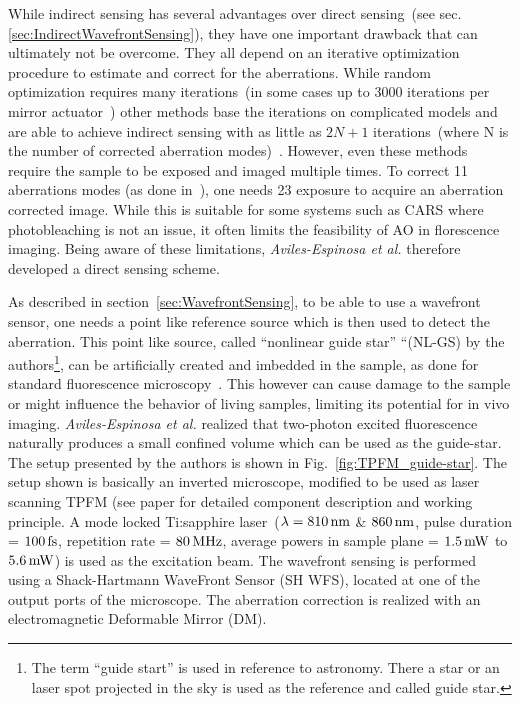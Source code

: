 While indirect sensing has several advantages over direct sensing~(see sec. \ref{sec:IndirectWavefrontSensing}), they have one important drawback that can ultimately not be overcome. They all depend on an iterative optimization procedure to estimate and correct for the aberrations. While random optimization requires many iterations~(in some cases up to 3000 iterations per mirror actuator~\cite{scan_CARS}) other methods base the iterations on complicated models and are able to achieve indirect sensing with as little as $2N+1$ iterations~(where N is the number of corrected aberration modes)~\cite{wide_AOM_loew_freq,wide_AOM_structured_illu,scan_TPFM_image_based}. However, even these methods require the sample to be exposed and imaged multiple times. To correct 11 aberrations modes (as done in~\cite{scan_TPFM_image_based}), one needs 23 exposure to acquire an aberration corrected image. While this is suitable for some systems such as CARS where photobleaching is not an issue, it often limits the feasibility of AO in florescence imaging. Being aware of these limitations, \emph{Aviles-Espinosa et al.} therefore developed a direct sensing scheme. 

As described in section~\ref{sec:WavefrontSensing}, to be able to use a wavefront sensor, one needs a point like reference source which is then used to detect the aberration. This point like source, called ``nonlinear guide star'' ``(NL-GS) by the authors\footnote{The term ``guide start'' is used in reference to astronomy. There a star or an laser spot projected in the sky is used as the reference and called guide star.}, can be artificially created and imbedded in the sample, as done for standard fluorescence microscopy~\cite{wide_fluorescence_guide_star}. This however can cause damage to the sample or might influence the behavior of living samples, limiting its potential for in vivo imaging. \emph{Aviles-Espinosa et al.} realized that two-photon excited fluorescence naturally produces a small confined volume which can be used as the guide-star. The setup presented by the authors is shown in Fig.~\ref{fig:TPFM_guide-star}. The setup shown is basically an inverted microscope, modified to be used as laser scanning TPFM (see paper for detailed component description and working principle. A mode locked Ti:sapphire laser~($\lambda = \unit[810]{nm}$ \& $\unit[860]{nm}$, pulse duration = $\unit[100]{fs}$, repetition rate = $\unit[80]{MHz}$, average powers in sample plane = $\unit[1.5]{mW}$ to $\unit[5.6]{mW}$) is used as the excitation beam. The wavefront sensing is performed using a Shack-Hartmann WaveFront Sensor (SH WFS), located at one of the output ports of the microscope. The aberration correction is realized with an electromagnetic Deformable Mirror (DM). 

